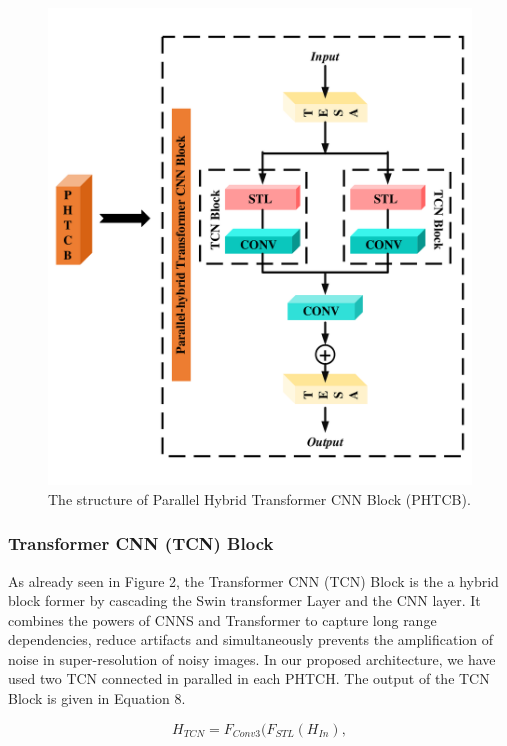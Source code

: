 \documentclass{ieeeaccess}
\begin{document}
\begin{figure}[ht]
  \includegraphics[width=\linewidth]{3FIGURE.pdf}
  \caption{The structure of Parallel Hybrid Transformer CNN Block (PHTCB).}
  \label{fig:3}
\end{figure}

\subsubsection{Transformer CNN (TCN) Block}

As already seen in Figure 2, the Transformer CNN (TCN) Block is the a hybrid block former by cascading the Swin transformer Layer and the CNN layer. It combines the powers of CNNS and Transformer to capture long range dependencies, reduce artifacts and simultaneously prevents the amplification of noise in super-resolution of noisy images. In our proposed architecture, we have used two TCN connected in paralled in each PHTCH. The output of the TCN Block is given in Equation 8. 

\begin{equation}
{H_{TCN}}= {F_{Conv3}}({F_{STL}}({H_{In}}),
\end{equation}
\end{document}
